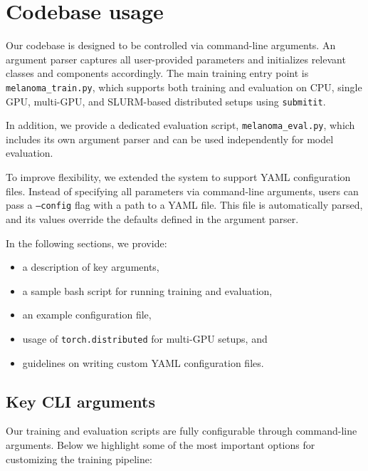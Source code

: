 \chapter{Codebase usage}
\label{ch:codebase_usage}

Our codebase is designed to be controlled via command-line arguments. An argument parser captures all user-provided parameters and initializes relevant classes and components accordingly. The main training entry point is \texttt{melanoma\_train.py}, which supports both training and evaluation on CPU, single GPU, multi-GPU, and SLURM-based distributed setups using \texttt{submitit}.

In addition, we provide a dedicated evaluation script, \texttt{melanoma\_eval.py}, which includes its own argument parser and can be used independently for model evaluation.

To improve flexibility, we extended the system to support YAML configuration files. Instead of specifying all parameters via command-line arguments, users can pass a \texttt{--config} flag with a path to a YAML file. This file is automatically parsed, and its values override the defaults defined in the argument parser.

In the following sections, we provide:
\begin{itemize}
    \item a description of key arguments,
    \item a sample bash script for running training and evaluation,
    \item an example configuration file,
    \item usage of \texttt{torch.distributed} for multi-GPU setups, and
    \item guidelines on writing custom YAML configuration files.
\end{itemize}

\section{Key CLI arguments}
Our training and evaluation scripts are fully configurable through command-line arguments. Below we highlight some of the most important options for customizing the training pipeline:

